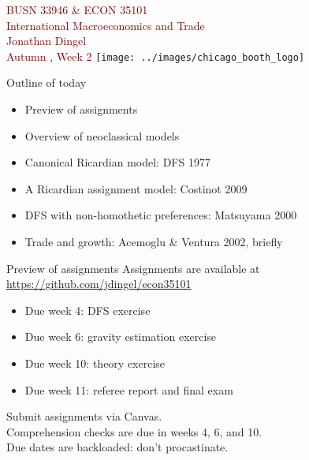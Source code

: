 \documentclass[10pt,notes=hide]{beamer}
\begin{document}
\begin{frame}[plain]
\begin{center}
\large
\textcolor{maroon}{BUSN 33946 \& ECON 35101\\
International Macroeconomics and Trade\\ 
Jonathan Dingel\\
Autumn \the\year, Week 2}
\vfill 
\texttt{[image: ../images/chicago\_booth\_logo]}
\end{center}
\end{frame}
\begin{frame}{Outline of today}
\begin{itemize}
	\item Preview of assignments
	\item Overview of neoclassical models
	\item Canonical Ricardian model: DFS 1977
	\item A Ricardian assignment model: Costinot 2009
	\item DFS with non-homothetic preferences: Matsuyama 2000
	\item Trade and growth: Acemoglu \& Ventura 2002, briefly
\end{itemize}
\end{frame}
\begin{frame}{Preview of assignments}
Assignments are available at \url{https://github.com/jdingel/econ35101}
\begin{itemize}
	\item Due week 4: DFS exercise
	\item Due week 6: gravity estimation exercise
	\item Due week 10: theory exercise
	\item Due week 11: referee report and final exam
\end{itemize}
Submit assignments via Canvas.\\
Comprehension checks are due in weeks 4, 6, and 10.\\
Due dates are backloaded: don't procastinate.
\end{frame}
\end{document}
